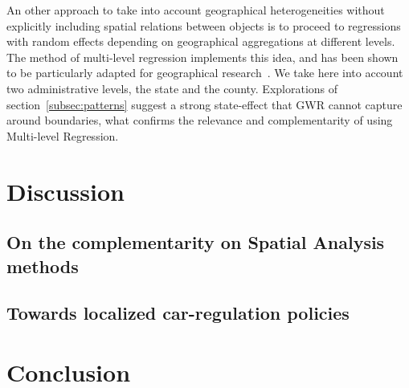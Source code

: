 \documentclass[3p,times,procedia]{elsarticle}
\begin{document}
An other approach to take into account geographical heterogeneities without explicitly including spatial relations between objects is to proceed to regressions with random effects depending on geographical aggregations at different levels. The method of multi-level regression implements this idea, and has been shown to be particularly adapted for geographical research~\cite{jones1991specifying}. We take here into account two administrative levels, the state and the county. Explorations of section~\ref{subsec:patterns} suggest a strong state-effect that GWR cannot capture around boundaries, what confirms the relevance and complementarity of using Multi-level Regression.






\section{Discussion} \label{sec:discuss}

\subsection{On the complementarity on Spatial Analysis methods}



\subsection{Towards localized car-regulation policies}



\section{Conclusion}
\end{document}
